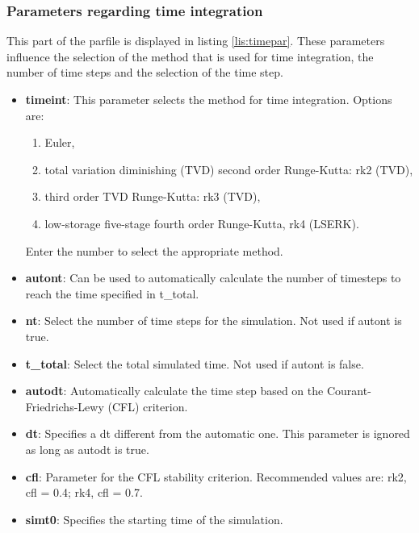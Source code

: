 		\subsubsection{Parameters regarding time integration}
			This part of the parfile is displayed in listing \ref{lis:timepar}. These parameters influence the selection of the method that is used for time integration, the number of time steps and the selection of the time step. 
			 
    		\begin{itemize}
    			\item \textbf{timeint}: This parameter selects the method for time integration. Options are:
  				\begin{enumerate}
  					\item Euler,
  					\item total variation diminishing (TVD) second order Runge-Kutta: rk2 (TVD),
  					\item third order TVD Runge-Kutta: rk3 (TVD),
  					\item low-storage five-stage fourth order Runge-Kutta, rk4 (LSERK).
  				\end{enumerate}
  				Enter the number to select the appropriate method.
  				\item \textbf{autont}: Can be used to automatically calculate the number of timesteps to reach the time specified in t\_total.
  				\item \textbf{nt}: Select the number of time steps for the simulation. Not used if autont is true.
  				\item \textbf{t\_total}: Select the total simulated time. Not used if autont is false.
  				\item \textbf{autodt}: Automatically calculate the time step based on the Courant-Friedrichs-Lewy (CFL) criterion.
  				\item \textbf{dt}: Specifies a dt different from the automatic one. This parameter is ignored as long as autodt is true. 
  				\item \textbf{cfl}: Parameter for the CFL stability criterion. Recommended values are: rk2, cfl = 0.4; rk4, cfl = 0.7.
  				\item \textbf{simt0}: Specifies the starting time of the simulation.
    		\end{itemize}

